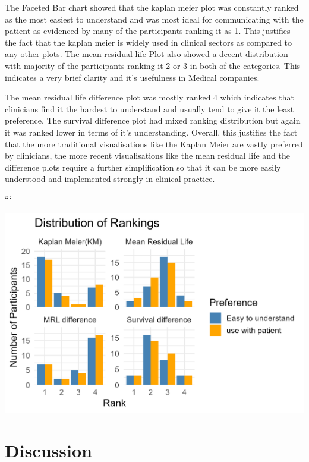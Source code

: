 \documentclass{article}
\begin{document}
The Faceted Bar chart showed that the kaplan meier plot was constantly ranked as the most easiest to understand and was most ideal for communicating with the patient as evidenced by many of the participants ranking it as 1. This justifies the fact that the kaplan meier is widely used in clinical sectors as compared to any other plots. The mean residual life Plot also showed a decent distribution with majority of the participants ranking it 2 or 3 in both of the categories. This indicates a very brief clarity and it's usefulness in Medical companies.

The mean residual life difference plot was mostly ranked 4 which indicates that clinicians find it the hardest to understand and usually tend to give it the least preference. The survival difference plot had mixed ranking distribution but again it was ranked lower in terms of it's understanding. Overall, this justifies the fact that the more traditional visualisations like the Kaplan Meier are vastly preferred by clinicians, the more recent visualisations like the mean residual life and the difference plots require a further simplification so that it can be more easily understood and implemented strongly in clinical practice.

```

\begin{center}\includegraphics[width=1\linewidth]{ranking_distribution} \end{center}

\section{Discussion}\label{discussion}
\end{document}
